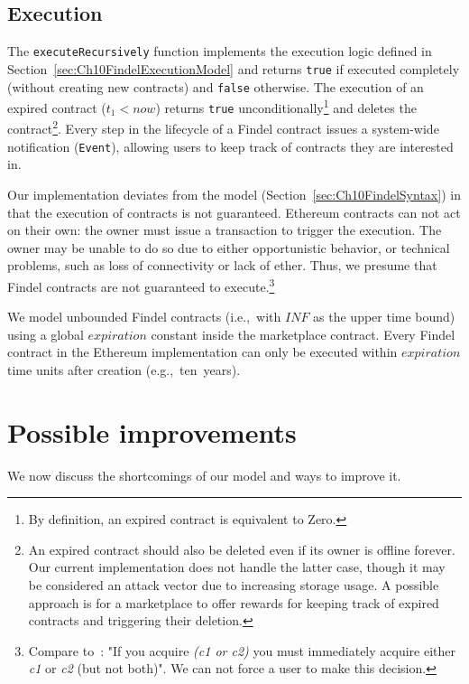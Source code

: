 \subsection{Execution} \label{sec:Ch10FindelExecutionImplementation}

The \texttt{executeRecursively} function implements the execution logic defined in Section~\ref{sec:Ch10FindelExecutionModel} and returns \texttt{true} if executed completely (without creating new contracts) and \texttt{false} otherwise.
The execution of an expired contract ($t_1 < now$) returns \texttt{true} unconditionally\footnote{By definition, an expired contract is equivalent to \(\mathrm{Zero}\).} and deletes the contract\footnote{An expired contract should also be deleted even if its owner is offline forever. Our current implementation does not handle the latter case, though it may be considered an attack vector due to increasing storage usage. A possible approach is for a marketplace to offer rewards for keeping track of expired contracts and triggering their deletion.}.
Every step in the lifecycle of a Findel contract issues a system-wide notification (\texttt{Event}), allowing users to keep track of contracts they are interested in.

Our implementation deviates from the model (Section~\ref{sec:Ch10FindelSyntax}) in that the execution of contracts is not guaranteed.
Ethereum contracts can not act on their own: the owner must issue a transaction to trigger the execution.
The owner may be unable to do so due to either opportunistic behavior, or technical problems, such as loss of connectivity or lack of ether.
Thus, we presume that Findel contracts are not guaranteed to execute.\footnote{Compare to~\cite{PeytonJones2000}: "If you acquire \textit{(c1 or c2)} you must immediately acquire either \textit{c1} or \textit{c2} (but not both)". We can not force a user to make this decision.}

We model unbounded Findel contracts (i.e.,~with $INF$ as the upper time bound) using a global $expiration$ constant inside the marketplace contract.
Every Findel contract in the Ethereum implementation can only be executed within $expiration$ time units after creation (e.g.,~ten~years).


\section{Possible improvements}

We now discuss the shortcomings of our model and ways to improve it.

